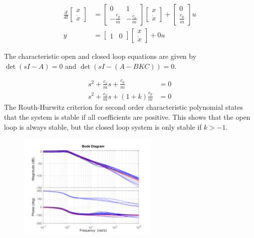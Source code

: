 \documentclass{article}
\begin{document}
\begin{align}
    \frac{d}{dt} \begin{bmatrix}
        x \\
        \dot{x}
    \end{bmatrix} &= \begin{bmatrix}
        0 & 1 \\
        -\frac{c_p}{m} & -\frac{c_v}{m}
    \end{bmatrix} \begin{bmatrix}
        x \\
        \dot{x}
    \end{bmatrix} + \begin{bmatrix}
        0 \\
        \frac{c_p}{m}
    \end{bmatrix} u \\
    y &= \begin{bmatrix}
        1 & 0
    \end{bmatrix} \begin{bmatrix}
        x \\
        \dot{x}
    \end{bmatrix} + 0u
\end{align}

The characteristic open and closed loop equations are given by $\det(sI - A) = 0$ and $\det(sI - (A-BKC)) = 0$.

\begin{align}
    s^2 + \frac{c_v}{m}s + \frac{c_p}{m} &= 0 \\
    s^2 + \frac{c_v}{m}s + (1+k)\frac{c_p}{m} &= 0
\end{align}
The Routh-Hurwitz criterion for second order characteristic polynomial states that the system is stable if all coefficients are positive.
This shows that the open loop is always stable, but the closed loop system is only stable if $k > -1$.

\begin{figure}[H]
    \centering
    \includegraphics[width=0.6\textwidth]{figures/bode_G.png}
    \caption{}
    \label{fig:bode_G}
\end{figure}
\end{document}
